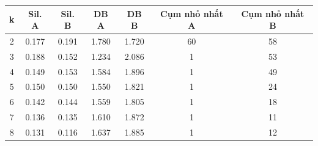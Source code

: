 \begin{tabular}{ccccccc}
\toprule
k & Sil. A & Sil. B & DB A & DB B & Cụm nhỏ nhất A & Cụm nhỏ nhất B \\
\midrule
2 & 0.177 & 0.191 & 1.780 & 1.720 & 60 & 58 \\
3 & 0.188 & 0.152 & 1.234 & 2.086 & 1 & 53 \\
4 & 0.149 & 0.153 & 1.584 & 1.896 & 1 & 49 \\
5 & 0.150 & 0.150 & 1.550 & 1.821 & 1 & 24 \\
6 & 0.142 & 0.144 & 1.559 & 1.805 & 1 & 18 \\
7 & 0.136 & 0.135 & 1.610 & 1.872 & 1 & 11 \\
8 & 0.131 & 0.116 & 1.637 & 1.885 & 1 & 12 \\
\bottomrule
\end{tabular}
